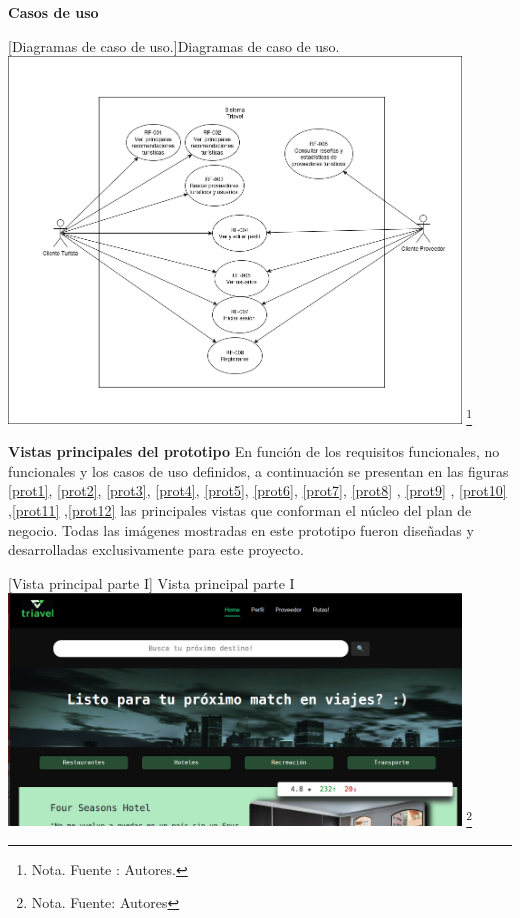 \textbf{Casos de uso}

    \vspace{2mm}
    \begin{minipage}{0.9\textwidth}
    \centering
    [{Diagramas de caso de uso.}]{Diagramas de caso de uso.}
    \label{caso1}
    \includegraphics[width=0.9\textwidth]{Content/Images/CasosDeUso.png}
    \footnote{Nota. \textup{Fuente : Autores.}}
    \end{minipage}


\textbf{Vistas principales del prototipo}
En función de los requisitos funcionales, no funcionales y los casos de uso definidos, a continuación se presentan en las figuras \ref{prot1}, \ref{prot2}, \ref{prot3}, \ref{prot4}, \ref{prot5}, \ref{prot6}, \ref{prot7}, \ref{prot8} , \ref{prot9} , \ref{prot10} ,\ref{prot11} ,\ref{prot12} las principales vistas que conforman el núcleo del plan de negocio. Todas las imágenes mostradas en este prototipo fueron diseñadas y desarrolladas exclusivamente para este proyecto.

    \vspace{2mm}
    \begin{minipage}{0.9\textwidth}
    \centering
    [{Vista principal parte I}]{ Vista principal parte I}
    \label{prot1}
    \includegraphics[width=0.9\textwidth]{Content/Images/VistaGeneral1.png}
    \footnote{Nota. \textup{Fuente: Autores}}
    \end{minipage}

